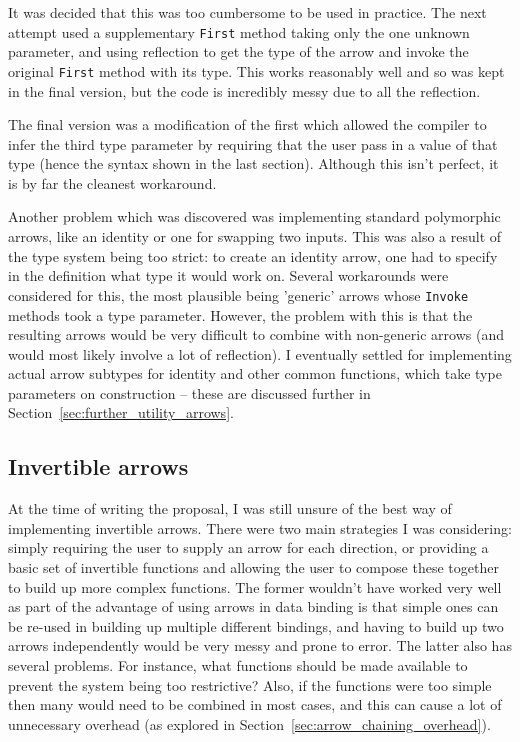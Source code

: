 \documentclass[12pt,twoside,notitlepage]{report}
\begin{document}
It was decided that this was too cumbersome to be used in practice. The next attempt used a supplementary \texttt{First} method taking only the one unknown parameter, and using reflection to get the type of the arrow and invoke the original \texttt{First} method with its type. This works reasonably well and so was kept in the final version, but the code is incredibly messy due to all the reflection.

The final version was a modification of the first which allowed the compiler to infer the third type parameter by requiring that the user pass in a value of that type (hence the syntax shown in the last section). Although this isn't perfect, it is by far the cleanest workaround.

Another problem which was discovered was implementing standard polymorphic arrows, like an identity or one for swapping two inputs. This was also a result of the type system being too strict: to create an identity arrow, one had to specify in the definition what type it would work on. Several workarounds were considered for this, the most plausible being 'generic' arrows whose \texttt{Invoke} methods took a type parameter. However, the problem with this is that the resulting arrows would be very difficult to combine with non-generic arrows (and would most likely involve a lot of reflection). I eventually settled for implementing actual arrow subtypes for identity and other common functions, which take type parameters on construction -- these are discussed further in Section~\ref{sec:further_utility_arrows}.

\subsection{Invertible arrows}

At the time of writing the proposal, I was still unsure of the best way of implementing invertible arrows. There were two main strategies I was considering: simply requiring the user to supply an arrow for each direction, or providing a basic set of invertible functions and allowing the user to compose these together to build up more complex functions. The former wouldn't have worked very well as part of the advantage of using arrows in data binding is that simple ones can be re-used in building up multiple different bindings, and having to build up two arrows independently would be very messy and prone to error. The latter also has several problems. For instance, what functions should be made available to prevent the system being too restrictive? Also, if the functions were too simple then many would need to be combined in most cases, and this can cause a lot of unnecessary overhead (as explored in Section~\ref{sec:arrow_chaining_overhead}).
\end{document}

